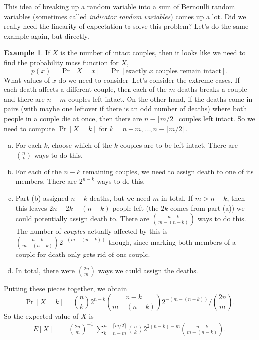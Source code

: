 \documentclass[12pt]{article}
\theoremstyle{plain}
\theoremstyle{definition}
\newtheorem{example}[theorem]{Example}
\theoremstyle{remark}
\begin{document}
This idea of breaking up a random variable into a sum of Bernoulli random variables (sometimes called \emph{indicator random variables}) comes up a lot.
Did we really need the linearity of expectation to solve this problem?
Let's do the same example again, but directly.

\begin{example}
    If $X$ is the number of intact couples, then it looks like we need to find the probability mass function for $X$,
    \[
        p(x) = \Pr[X = x] = \Pr[\text{exactly $x$ couples remain intact}].
    \]
    What values of $x$ do we need to consider.
    Let's consider the extreme cases.
    If each death affects a different couple, then each of the $m$ deaths breaks a couple and there are $n-m$ couples left intact.
    On the other hand, if the deaths come in pairs (with maybe one leftover if there is an odd number of deaths) where both people in a couple die at once, then there are $n - \lceil m/2\rceil$ couples left intact.
    So we need to compute $\Pr[X = k]$ for $k = n-m, \ldots, n-\lceil m/2\rceil$.

    \begin{enumerate}[(a)]
        \item For each $k$, choose which of the $k$ couples are to be left intact. There are $\binom{n}{k}$ ways to do this.

        \item For each of the $n-k$ remaining couples, we need to assign death to one of its members. There are $2^{n-k}$ ways to do this.

        \item Part (b) assigned $n-k$ deaths, but we need $m$ in total.
        If $m>n-k$, then this leaves $2n - 2k - (n-k)$ people left (the $2k$ comes from part (a)) we could potentially assign death to.
        There are $\binom{n-k}{m-(n-k)}$ ways to do this.
        The number of \emph{couples} actually affected by this is $\binom{n-k}{m-(n-k)}2^{-(m-(n-k))}$ though, since marking both members of a couple for death only gets rid of one couple.

        \item In total, there were $\binom{2n}{m}$ ways we could assign the deaths.
    \end{enumerate}

    Putting these pieces together, we obtain
    \[
        \Pr[X = k] = \binom{n}{k}2^{n-k}\binom{n-k}{m-(n-k)}2^{-(m-(n-k))}\big/\binom{2n}{m}.
    \]
    So the expected value of $X$ is
    \begin{align*}
        E[X] &= \binom{2n}{m}^{-1}\ \sum_{k=n-m}^{n-\lceil m/2\rceil} \binom{n}{k}2^{2(n-k)-m}\binom{n-k}{m-(n-k)}.
    \end{align*}

\end{example}
\end{document}
